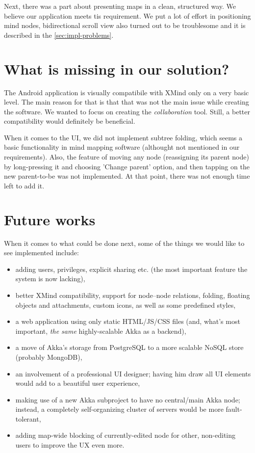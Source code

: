 Next, there was a part about presenting maps in a clean, structured way. We believe our application meets tis requirement. We put a lot of effort in positioning mind nodes, bidirectional scroll view also turned out to be troublesome and it is described in the \cref{sec:impl-problems}.

\section{What is missing in our solution?}
\label{summary-missing}
The Android application is visually compatibile with XMind only on a very basic level. The main reason for that is that that was not the main issue while creating the software. We wanted to focus on creating the \emph{collaboration} tool. Still, a better compatibility would definitely be beneficial. 

When it comes to the UI, we did not implement subtree folding, which seems a basic functionality in mind mapping software (althought not mentioned in our requirements). Also, the feature of moving any node (reassigning its parent node) by long-pressing it and choosing 'Change parent' option, and then tapping on the new parent-to-be was not implemented. At that point, there was not enough time left to add it.

\section{Future works}
\label{summary-future}
When it comes to what could be done next, some of the things we would like to see implemented include:

\begin{itemize}
	\item adding users, privileges, explicit sharing etc. (the most important feature the system is now lacking),
	\item better XMind compatibility, support for node--node relations, folding, floating objects and attachments, custom icons, as well as some predefined styles,
	\item a web application using only static HTML/JS/CSS files (and, what's most important, \emph{the same} highly-scalable Akka as a backend),
	\item a move of Akka's storage from PostgreSQL to a more scalable NoSQL store (probably MongoDB),
	\item an involvement of a professional UI designer; having him draw all UI elements would add to a beautiful user experience,
	\item making use of a new  Akka subproject to have no central/main Akka node; instead, a completely self-organizing cluster of servers would be more fault-tolerant,
	\item adding map-wide blocking of currently-edited node for other, non-editing users to improve the UX even more.
\end{itemize}
